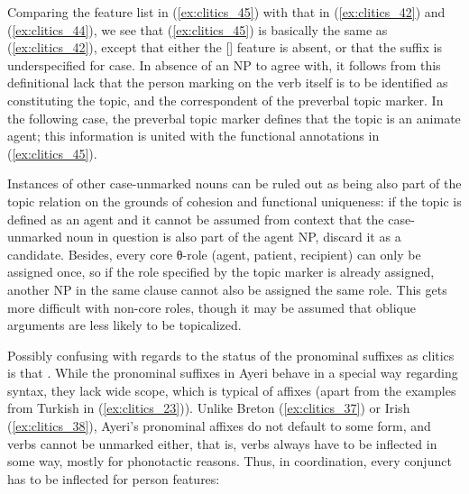 Comparing the feature list in (\ref{ex:clitics_45}) with that in
(\ref{ex:clitics_42}) and (\ref{ex:clitics_44}), we see that
(\ref{ex:clitics_45}) is basically the same as (\ref{ex:clitics_42}), except
that either the [\Case{}] feature is absent, or that the suffix is
underspecified for case. In absence of an NP to agree with, it follows from
this definitional lack that the person marking on the verb itself is to be
identified as constituting the topic, and the correspondent of the preverbal
topic marker. In the following case, the preverbal topic marker defines that
the topic is an animate agent; this information is united with the functional
annotations in (\ref{ex:clitics_45}).

\ex\label{ex:clitics_46}
\xe

Instances of other case-unmarked nouns can be ruled out as being also part of
the topic relation on the grounds of cohesion and functional uniqueness: if the
topic is defined as an agent and it cannot be assumed from context that the
case-unmarked noun in question is also part of the agent NP, discard it as a
candidate. Besides, every core θ-role (agent, patient, recipient) can only be
assigned once, so if the role specified by the topic marker is already
assigned, another NP in the same clause cannot also be assigned the same role.
This gets more difficult with non-core roles, though it may be assumed that
oblique arguments are less likely to be topicalized.

Possibly confusing with regards to the status of the pronominal suffixes as
cli\-tics is that .
While the pronominal suffixes in Ayeri behave in a special way regarding
syntax, they lack wide scope, which is typical of affixes (apart from the
examples from Turkish in (\ref{ex:clitics_23})). Unlike Breton
(\ref{ex:clitics_37}) or Irish (\ref{ex:clitics_38}), Ayeri's pronominal
affixes do not default to some form, and verbs cannot be unmarked either, that
is, verbs always have to be inflected in some way, mostly for phonotactic
reasons. Thus, in coordination, every conjunct has to be inflected for person
features:


